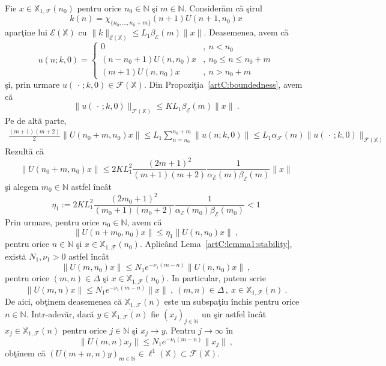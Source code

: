 \documentclass[ a4paper, 12pt]{report}
\newcommand{\E}{\mathcal{E}}
\newcommand{\F}{\mathcal{F}}
\newcommand{\N}{\mathbb{N}}
\newcommand{\X}{\mathbb{X}}
\theoremstyle{definition}
\theoremstyle{remark}
\numberwithin{equation}{section}
\begin{document}
Fie $x\in\X_{1,\F}(n_0)$ pentru orice $n_0\in\N$ \c si $m\in\N$. Consider\u am c\u a \c sirul
\begin{equation}
k(n)=\chi_{\{n_0,..., n_0+m\}}(n+1)U(n+1,n_0)x
\end{equation}
apar\c tine lui $\E(\X)$ cu $\|k\|_{\E(\X)}\leq L_1\beta_{\E}(m)\|x\|$. Deasemenea, avem c\u a
\begin{equation}
u(n;k,0) = \begin{cases}
0 &,\ n<n_0\\
(n-n_0+1) U(n,n_0)x &,\ n_0\leq n\leq n_0+m\\
(m+1) U(n,n_0)x &,\ n>n_0+m
\end{cases}
\end{equation}
\c si, prin urmare $u(\,\cdot\,;k,0)\in\F(\X)$. Din Propozi\c tia~\ref{artC:boundedness}, avem c\u a
$$\|u(\,\cdot\,;k,0)\|_{\F(\X)}\leq KL_1 \beta_{\E}(m)\|x\|\ .$$
Pe de alt\u a parte,
\begin{gather}
\frac{(m+1)(m+2)}{2}\|U(n_0+m,n_0)x\| \leq L_1 \sum_{n=n_0}^{n_0+m} \|u(n;k,0)\| \leq
L_1\alpha_{\F}(m) \|u(\,\cdot\,;k,0)\|_{\F(\X)}
\end{gather}
Rezult\u a c\u a
\begin{equation}
\|U(n_0+m,n_0)x\|\leq 2KL_1^2 \frac{(2m+1)^2}{(m+1)(m+2)}\frac{1}{\alpha_{\E}(m)\beta_{\E}(m)}\|x\|
\end{equation}
\c si alegem $m_0\in\N$ astfel \^inc\^at
$$\eta_1:= 2KL_1^2 \frac{(2m_0+1)^2}{(m_0+1)(m_0+2)}\frac{1}{\alpha_{\E}(m_0)\beta_{\E}(m_0)} <1 $$
Prin urmare, pentru orice $n_0\in\N$, avem c\u a
$$\|U(n+m_0,n_0)x\|\leq \eta_1 \|U(n,n_0)x\|\ ,$$
pentru orice $n\in\N$ \c si $x\in\X_{1,\F}(n_0)$.
Aplic\^and Lema~\ref{artC:lemma1:stability}, exist\u a  $N_1,\nu_1>0$ astfel \^inc\^at
$$\|U(m,n_0)x\|\leq N_1e^{-\nu_1(m-n)}\|U(n,n_0)x\|\ ,$$
pentru orice $(m,n)\in\Delta$ \c si $x\in\X_{1,\F}(n_0)$.
In particular, putem scrie
\begin{equation}
\|U(m,n)x\|\leq N_1e^{-\nu_1 (m-n)}\|x\|\ ,\ (m,n)\in\Delta\,,\ x\in\X_{1,\F}(n)\ .
\end{equation}
De aici, ob\c tinem deasemenea c\u a $\X_{1,\F}(n)$ este un subspa\c tiu \^inchis pentru orice $n\in\N$.
Intr-adev\u ar, dac\u a $y\in\overline{\X_{1,\F}(n)}$ fie $(x_j)_{j\in\N}$ un \c sir astfel \^inc\^at
$x_j\in\X_{1,\F}(n)$ pentru orice $j\in\N$ \c si $x_j\to y$. Pentru $j\to\infty$ \^in
$$\|U(m,n)x_j\|\leq N_1e^{-\nu_1 (m-n)}\|x_j\|\ ,$$
ob\c tinem c\u a  $(U(m+n,n)y)_{m\in\N}\in\ell^1(\X)\subset\F(\X)$.
\end{document}
